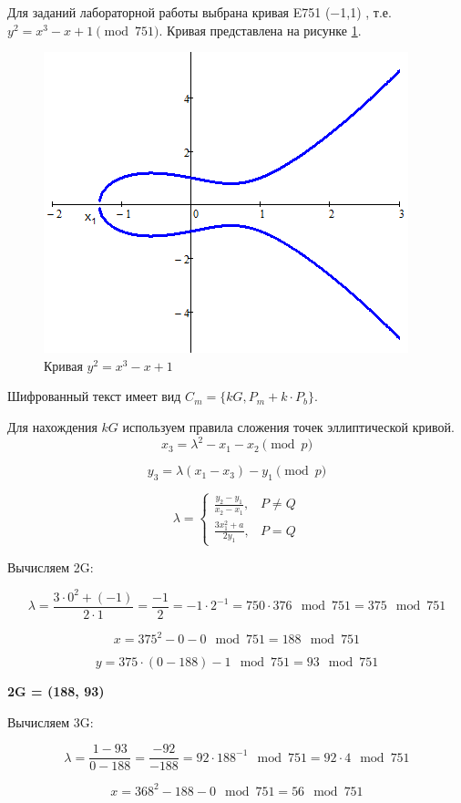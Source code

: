 Для заданий лабораторной работы выбрана кривая E751 (−1,1) , т.е. $y^2 = x^3 − x +1 \pmod{751}$. Кривая представлена на рисунке \ref{fig:elcurve3}.

\begin{figure}[H]
	\centering
	\includegraphics[width=0.7\linewidth]{img/elCurve3}
	\caption{Кривая $y^2 = x^3 − x +1$}
	\label{fig:elcurve3}
\end{figure}


Шифрованный текст имеет вид $C_m = \{ kG, P_m + k \cdot P_b\}$.

Для нахождения $kG$ используем правила сложения точек эллиптической кривой.
\[
x_3 = \lambda^2 - x_1 - x_2 \pmod{p} 
\]

\[
y_3 = \lambda(x_1-x_3) -y_1 \pmod{p}
\]


\[
\lambda = 
\begin{cases}
\frac{y_2-y_1}{x_2-x_1}, & P \neq Q\\
\frac{3x^2_1+a}{2y_1}, & P = Q
\end{cases}
\]



Вычисляем 2G:

\[
\lambda = \frac{ 3 \cdot 0^2 + (-1) }{2 \cdot 1} = \frac{-1}{2} = -1 \cdot 2^{-1} = 750 \cdot 376\mod{751} = 375\mod{751}
\]


\[
x = 375^2 - 0 - 0 \mod{751} = 188\mod{751}
\]


\[
y = 375 \cdot (0 - 188) - 1\mod{751} = 93\mod{751}
\]

\textbf{2G = (188, 93)}

Вычисляем 3G:

\[
\lambda = \frac{1-93}{0-188} = \frac{-92}{-188} = 92 \cdot 188^{-1}\mod{751} = 92 \cdot 4\mod{751}
\]


\[
x = 368^2 - 188 - 0 \mod{751} = 56\mod{751}
\]



